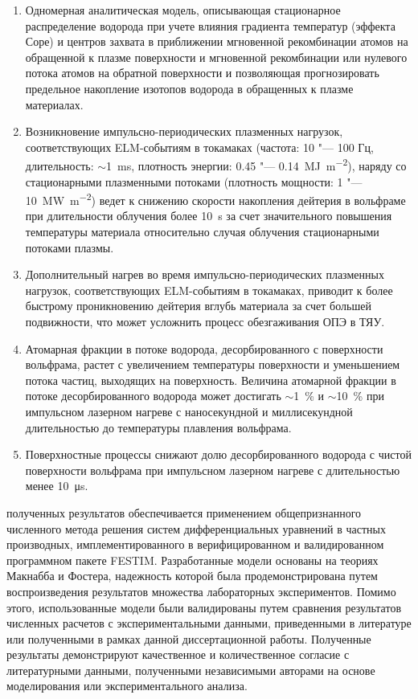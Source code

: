{}
\begin{enumerate}[beginpenalty=10000] %
    \item Одномерная аналитическая модель, описывающая стационарное распределение водорода при учете влияния градиента температур (эффекта Соре) и центров захвата в приближении мгновенной рекомбинации атомов на обращенной к плазме поверхности и мгновенной рекомбинации или нулевого потока атомов на обратной поверхности и позволяющая прогнозировать предельное накопление изотопов водорода в обращенных к плазме материалах.
    \item Возникновение импульсно-периодических плазменных нагрузок, соответствующих ELM-событиям в токамаках (частота: 10 "--- 100 Гц, длительность: $\sim$\SI{1}{\milli\second}, плотность энергии: 0.45 "--- \SI{0.14}{\mega\joule\per\meter\squared}), наряду со стационарными плазменными потоками (плотность мощности: 1 "--- \SI{10}{\mega\watt\per\meter\squared}) ведет к снижению скорости накопления дейтерия в вольфраме при длительности облучения более \SI{10}{\second} за счет значительного повышения температуры материала относительно случая облучения стационарными потоками плазмы. 
    \item Дополнительный нагрев во время импульсно-периодических плазменных нагрузок, соответствующих ELM-событиям в токамаках, приводит к более быстрому проникновению дейтерия вглубь материала за счет большей подвижности, что может усложнить процесс обезгаживания ОПЭ в ТЯУ. 
    \item Атомарная фракции в потоке водорода, десорбированного с поверхности вольфрама, растет с увеличением температуры поверхности и уменьшением потока частиц, выходящих на поверхность. Величина атомарной фракции в потоке десорбированного водорода может достигать $\sim$1~\% и $\sim$10~\% при импульсном лазерном нагреве с наносекундной и миллисекундной длительностью до температуры плавления вольфрама.
    \item Поверхностные процессы снижают долю десорбированного водорода с чистой поверхности вольфрама при импульсном лазерном нагреве с длительностью менее \SI{10}{\micro\second}.
\end{enumerate}

{\reliability} полученных результатов обеспечивается применением общепризнанного численного метода решения систем дифференциальных уравнений в частных производных, имплементированного в верифицированном и валидированном программном пакете FESTIM. Разработанные модели основаны на теориях Макнабба и Фостера, надежность которой была продемонстрирована путем воспроизведения результатов множества лабораторных экспериментов. Помимо этого, использованные модели были валидированы путем сравнения результатов численных расчетов с экспериментальными данными, приведенными в литературе или полученными в рамках данной диссертационной работы. Полученные результаты демонстрируют качественное и количественное согласие с литературными данными, полученными независимыми авторами на основе моделирования или экспериментального анализа.

